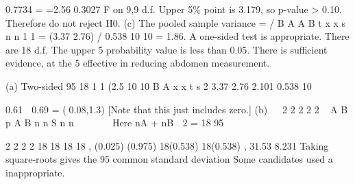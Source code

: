 \documentclass[a4paper,12pt]{article}
\begin{document}
0.7734
= =2.56
0.3027
F on 9,9 d.f.
Upper 5\% point is 3.179, so p-value > 0.10.
Therefore do not reject H0.
(c) The pooled sample variance
= / B A
A B
t x x s
n n
1 1
= (3.37 2.76) / 0.538
10 10
= 1.86.
A one-sided test is appropriate.
There are 18 d.f. The upper 5%
probability value is less than 0.05. There is sufficient evidence, at
the 5%
effective in reducing abdomen measurement.
\item (a) Two-sided 95%
18
1 1
(2.5%
10 10 B A x x t s
2
3.37 2.76 2.101 0.538
10

0.61  0.69 = (0.08,1.3)
[Note that this just includes zero.]
(b)  
2
2
2 2 2 ~ A B
p
A B n n
S
n n     

Here nA + nB  2 = 18
95%

2 2
2 2
18 18
18 18
,
(0.025) (0.975)
18(0.538) 18(0.538)
,
31.53 8.231
Taking square-roots gives the 95%
common standard deviation %
Some candidates used a %
inappropriate.
\end{document}
